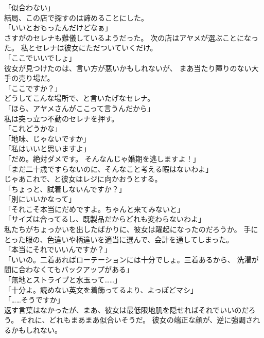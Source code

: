 \documentclass[../IHMain]{subfiles}
\begin{document}
「似合わない」\\
結局、この店で探すのは諦めることにした。\\
「いいとおもったんだけどなぁ」\\
さすがのセレナも難儀しているようだった。
次の店はアヤメが選ぶことになった。
私とセレナは彼女にただついていくだけ。\\
「ここでいいでしょ」\\
彼女が見つけたのは、言い方が悪いかもしれないが、
まあ当たり障りのない大手の売り場だ。\\
「ここですか？」\\
どうしてこんな場所で、と言いたげなセレナ。\\
「ほら、アヤメさんがここって言うんだから」\\
私は突っ立つ不動のセレナを押す。\\
「これどうかな」\\
「地味、じゃないですか」\\
「私はいいと思いますよ」\\
「だめ。絶対ダメです。
そんなんじゃ婚期を逃しますよ！」\\
「まだ二十歳ですらないのに、そんなこと考える暇はないわよ」\\
じゃあこれで、と彼女はレジに向かおうとする。\\
「ちょっと、試着しないんですか？」\\
「別にいいかなって」\\
「それこそ本当にだめですよ。ちゃんと来てみないと」\\
「サイズは合ってるし、既製品だからどれも変わらないわよ」\\
私たちがちょっかいを出したばかりに、彼女は躍起になったのだろうか。
手にとった服の、色違いや柄違いを適当に選んで、会計を通してしまった。\\
「本当にそれでいいんですか？」\\
「いいの。二着あればローテーションには十分でしょ。三着あるから、
洗濯が間に合わなくてもバックアップがある」\\
「無地とストライプと水玉って……」\\
「十分よ。読めない英文を着飾ってるより、よっぽどマシ」\\
「……そうですか」\\
返す言葉はなかったが、まあ、彼女は最低限地肌を隠せればそれでいいのだろう。
それに、どれもまあまあ似合いそうだ。
彼女の端正な顔が、逆に強調されるかもしれない。
\end{document}
